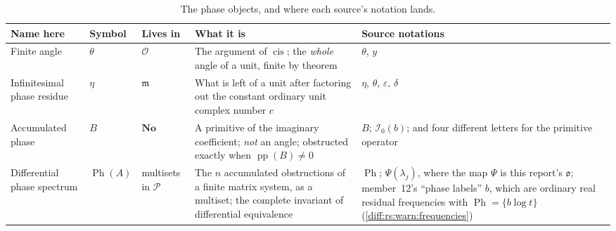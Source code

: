 \documentclass[11pt,letterpaper]{article}
\numberwithin{equation}{section}
\theoremstyle{definition}
\theoremstyle{remark}
\newcommand{\No}{\mathbf{No}}
\newcommand{\Ofin}{\mathcal O}
\newcommand{\mm}{\mathfrak m}
\newcommand{\Pcl}{\mathcal P}
\newcommand{\Izero}{\mathcal I_{0}}
\newcommand{\Obs}{\mathfrak o}
\newcommand{\pp}{\operatorname{pp}}
\newcommand{\cis}{\operatorname{cis}}
\newcommand{\Ph}{\operatorname{Ph}}
\begin{document}
\begin{table}[htbp]
\centering\small
\caption{The phase objects, and where each source's notation lands.}
\label{diff:tab:phases}
\begin{tabularx}{\textwidth}{@{}L{0.16\textwidth}L{0.10\textwidth}L{0.13\textwidth}YL{0.20\textwidth}@{}}
\toprule
Name here & Symbol & Lives in & What it is & Source notations \\
\midrule
Finite angle & $\theta$ & $\Ofin$ &
The argument of $\cis$; the \emph{whole} angle of a unit, finite by theorem &
$\theta$, $y$ \\[0.3em]
Infinitesimal phase residue & $\eta$ & $\mm$ &
What is left of a unit after factoring out the constant ordinary unit complex
number $c$ &
$\eta$, $\theta$, $\varepsilon$, $\delta$ \\[0.3em]
Accumulated phase & $B$ & $\No$ &
A primitive of the imaginary coefficient; \emph{not} an angle; obstructed
exactly when $\pp(B)\neq0$ &
$B$; $\Izero(b)$; and four different letters for the primitive operator \\[0.3em]
Differential phase spectrum & $\Ph(A)$ & multisets in $\Pcl$ &
The $n$ accumulated obstructions of a finite matrix system, as a multiset; the
complete invariant of differential equivalence &
$\operatorname{Ph}$; $\Psi(\lambda_{j})$, where the map $\Psi$ is this
report's $\Obs$; member~12's ``phase labels'' $b$, which are ordinary real
residual frequencies with $\Ph=\{b\log t\}$ (\cref{diff:rs:warn:frequencies}) \\
\bottomrule
\end{tabularx}
\end{table}
\end{document}
